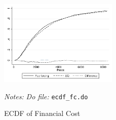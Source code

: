 \documentclass[11pt]{article}
\begin{document}
\begin{figure}[H]
        \caption{ECDF of Financial Cost}
    \label{ecdf_fc}
    \begin{center}
        \centering
        \includegraphics[width=0.5\textwidth]{Figuras/cdf_fc_pro_2.pdf}
    \end{center}
    \footnotesize \textit{Notes: } 
     \footnotesize{ \textit{Do file: }  \texttt{ecdf\_fc.do}}
\end{figure}
\end{document}
